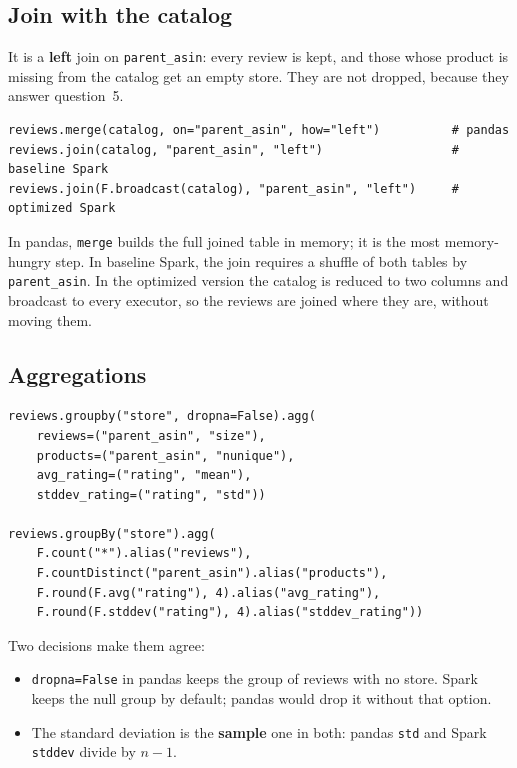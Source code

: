 \documentclass[11pt,a4paper]{article}
\begin{document}
\subsection{Join with the catalog}

It is a \textbf{left} join on \texttt{parent\_asin}: every review is kept, and those whose
product is missing from the catalog get an empty store. They are not dropped, because they
answer question~5.

\begin{lstlisting}[caption={Join in pandas, baseline Spark and optimized Spark.}]
reviews.merge(catalog, on="parent_asin", how="left")          # pandas
reviews.join(catalog, "parent_asin", "left")                  # baseline Spark
reviews.join(F.broadcast(catalog), "parent_asin", "left")     # optimized Spark
\end{lstlisting}

In pandas, \texttt{merge} builds the full joined table in memory; it is the most
memory-hungry step. In baseline Spark, the join requires a shuffle of both tables by
\texttt{parent\_asin}. In the optimized version the catalog is reduced to two columns and
broadcast to every executor, so the reviews are joined where they are, without moving them.

\subsection{Aggregations}

\begin{lstlisting}[caption={Store aggregate in pandas (top) and Spark (bottom).}]
reviews.groupby("store", dropna=False).agg(
    reviews=("parent_asin", "size"),
    products=("parent_asin", "nunique"),
    avg_rating=("rating", "mean"),
    stddev_rating=("rating", "std"))

reviews.groupBy("store").agg(
    F.count("*").alias("reviews"),
    F.countDistinct("parent_asin").alias("products"),
    F.round(F.avg("rating"), 4).alias("avg_rating"),
    F.round(F.stddev("rating"), 4).alias("stddev_rating"))
\end{lstlisting}

Two decisions make them agree:

\begin{itemize}
  \item \texttt{dropna=False} in pandas keeps the group of reviews with no store. Spark keeps
  the null group by default; pandas would drop it without that option.
  \item The standard deviation is the \textbf{sample} one in both: pandas \texttt{std} and
  Spark \texttt{stddev} divide by $n-1$.
\end{itemize}
\end{document}

